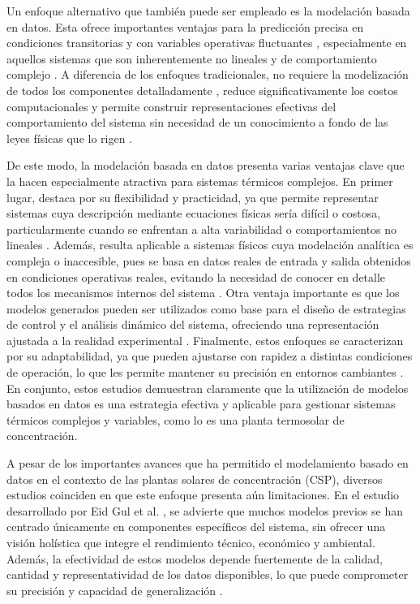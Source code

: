 \documentclass[11pt]{report}
\begin{document}
Un enfoque alternativo que también puede ser empleado es la modelación basada en datos. Esta ofrece importantes ventajas para la predicción precisa en condiciones transitorias y con variables operativas fluctuantes \cite{osorio2022forecasting}, especialmente en aquellos sistemas que son inherentemente no lineales y de comportamiento complejo \cite{csurcsia2020user}. A diferencia de los enfoques tradicionales, no requiere la modelización de todos los componentes detalladamente \cite{osorio2022forecasting}, reduce significativamente los costos computacionales y permite construir representaciones efectivas del comportamiento del sistema sin necesidad de un conocimiento a fondo de las leyes físicas que lo rigen \cite{bravo2008modelado}. 

De este modo, la modelación basada en datos presenta varias ventajas clave que la hacen especialmente atractiva para sistemas térmicos complejos. En primer lugar, destaca por su flexibilidad y practicidad, ya que permite representar sistemas cuya descripción mediante ecuaciones físicas sería difícil o costosa, particularmente cuando se enfrentan a alta variabilidad o comportamientos no lineales \cite{bravo2008modelado}. Además, resulta aplicable a sistemas físicos cuya modelación analítica es compleja o inaccesible, pues se basa en datos reales de entrada y salida obtenidos en condiciones operativas reales, evitando la necesidad de conocer en detalle todos los mecanismos internos del sistema \cite{bravo2008modelado}. Otra ventaja importante es que los modelos generados pueden ser utilizados como base para el diseño de estrategias de control y el análisis dinámico del sistema, ofreciendo una representación ajustada a la realidad experimental \cite{Mondal2024}. Finalmente, estos enfoques se caracterizan por su adaptabilidad, ya que pueden ajustarse con rapidez a distintas condiciones de operación, lo que les permite mantener su precisión en entornos cambiantes \cite{Mondal2024}. En conjunto, estos estudios demuestran claramente que la utilización de modelos basados en datos es una estrategia efectiva y aplicable  para gestionar sistemas térmicos complejos y variables, como lo es una planta termosolar de concentración.

A pesar de los importantes avances que ha permitido el modelamiento basado en datos en el contexto de las plantas solares de concentración (CSP), diversos estudios coinciden en que este enfoque presenta aún limitaciones. En el estudio desarrollado por Eid Gul et al. \cite{GUL2025125210}, se advierte que muchos modelos previos se han centrado únicamente en componentes específicos del sistema, sin ofrecer una visión holística que integre el rendimiento técnico, económico y ambiental. Además, la efectividad de estos modelos depende fuertemente de la calidad, cantidad y representatividad de los datos disponibles, lo que puede comprometer su precisión y capacidad de generalización \cite{GUL2025125210}. 
\end{document}
